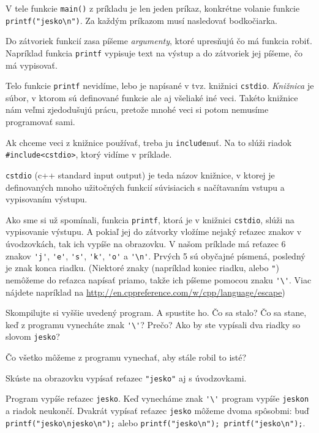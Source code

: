 V tele funkcie \verb!main()! z príkladu je len jeden príkaz, konkrétne volanie
funkcie \verb!printf("jesko\n")!. Za každým príkazom musí nasledovať
bodkočiarka.

Do zátvoriek funkcií zasa píšeme \emph{argumenty}, ktoré upresňujú čo má
funkcia robiť. Napríklad funkcia \verb!printf! vypisuje text na výstup a do
zátvoriek jej píšeme, čo má vypisovať.

\medskip

Telo funkcie \verb!printf! nevidíme, lebo je napísané v tvz. knižnici
\verb!cstdio!.  \emph{Knižnica} je súbor, v ktorom sú definované funkcie ale aj
všeliaké iné veci.  Takéto knižnice nám veľmi zjedodušujú prácu, pretože mnohé
veci si potom nemusíme programovať sami. 

Ak chceme veci z knižnice používať, treba ju \verb!include!nuť. Na to
slúži riadok \verb!#include<cstdio>!, ktorý vidíme v príklade.

\verb!cstdio! (c++ standard input output) je teda názov knižnice, v ktorej je
definovaných mnoho užitočných funkcií súvisiacich s načítavaním vstupu a
vypisovaním výstupu. 

Ako sme si už spomínali, funkcia \verb!printf!, ktorá je v knižnici
\verb!cstdio!, slúži na vypisovanie výstupu.  A pokiaľ jej do zátvorky vložíme
nejaký reťazec znakov v úvodzovkách, tak ich vypíše na obrazovku.  V našom
príklade má reťazec 6 znakov \verb!'j'!, \verb!'e'!, \verb!'s'!, \verb!'k'!,
\verb!'o'! a \verb!'\n'!.  Prvých 5 sú obyčajné písmená, posledný je znak konca
riadku. (Niektoré znaky (napríklad koniec riadku, alebo \verb!"!) nemôžeme do
reťazca napísať priamo, takže ich píšeme pomocou znaku \verb!'\'!. Viac nájdete
napríklad na \url{http://en.cppreference.com/w/cpp/language/escape})

\medskip

\cvicenie Skompilujte si vyššie uvedený program. A spustite ho. Čo sa stalo?
Čo sa stane, keď z programu vynecháte znak \verb!'\'!? Prečo?  Ako by ste
vypísali dva riadky so slovom \verb!jesko!?

\cvicenie Čo všetko môžeme z programu vynechať, aby stále robil to isté?
 
\cvicenie Skúste na obrazovku vypísať reťazec \verb!"jesko"! aj s
úvodzovkami.

\riesenie Program vypíše reťazec \verb"jesko". Keď vynecháme znak \verb!'\'!
program vypíše \verb"jeskon" a riadok neukončí.  Dvakrát vypísať reťazec
\verb"jesko" môžeme dvoma spôsobmi: buď \verb!printf("jesko\njesko\n");! alebo
\verb!printf("jesko\n"); printf("jesko\n");!.

